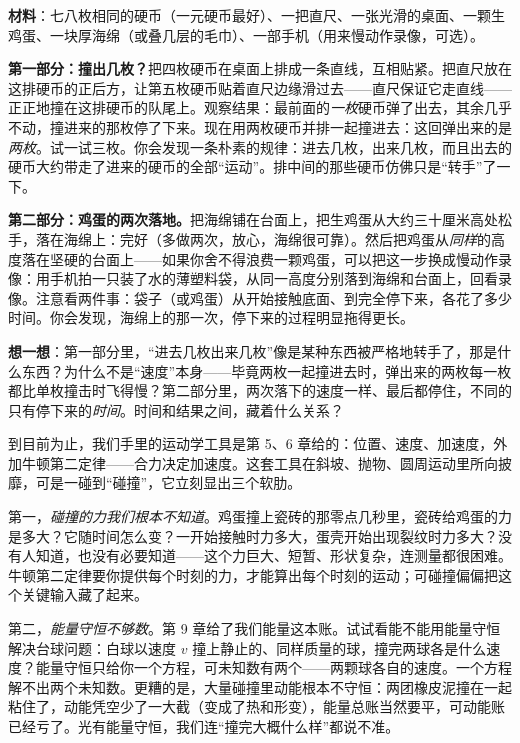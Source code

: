 \begin{experiment}[桌面上的碰撞快递]
\textbf{材料}：七八枚相同的硬币（一元硬币最好）、一把直尺、一张光滑的桌面、一颗生鸡蛋、一块厚海绵（或叠几层的毛巾）、一部手机（用来慢动作录像，可选）。

\textbf{第一部分：撞出几枚？}把四枚硬币在桌面上排成一条直线，互相贴紧。把直尺放在这排硬币的正后方，让第五枚硬币贴着直尺边缘滑过去——直尺保证它走直线——正正地撞在这排硬币的队尾上。观察结果：最前面的\emph{一枚}硬币弹了出去，其余几乎不动，撞进来的那枚停了下来。现在用两枚硬币并排一起撞进去：这回弹出来的是\emph{两枚}。试一试三枚。你会发现一条朴素的规律：进去几枚，出来几枚，而且出去的硬币大约带走了进来的硬币的全部“运动”。排中间的那些硬币仿佛只是“转手”了一下。

\textbf{第二部分：鸡蛋的两次落地。}把海绵铺在台面上，把生鸡蛋从大约三十厘米高处松手，落在海绵上：完好（多做两次，放心，海绵很可靠）。然后把鸡蛋从\emph{同样}的高度落在坚硬的台面上——如果你舍不得浪费一颗鸡蛋，可以把这一步换成慢动作录像：用手机拍一只装了水的薄塑料袋，从同一高度分别落到海绵和台面上，回看录像。注意看两件事：袋子（或鸡蛋）从开始接触底面、到完全停下来，各花了多少时间。你会发现，海绵上的那一次，停下来的过程明显拖得更长。

\textbf{想一想}：第一部分里，“进去几枚出来几枚”像是某种东西被严格地转手了，那是什么东西？为什么不是“速度”本身——毕竟两枚一起撞进去时，弹出来的两枚每一枚都比单枚撞击时飞得慢？第二部分里，两次落下的速度一样、最后都停住，不同的只有停下来的\emph{时间}。时间和结果之间，藏着什么关系？
\end{experiment}


到目前为止，我们手里的运动学工具是第 5、6 章给的：位置、速度、加速度，外加牛顿第二定律——合力决定加速度。这套工具在斜坡、抛物、圆周运动里所向披靡，可是一碰到“碰撞”，它立刻显出三个软肋。

第一，\emph{碰撞的力我们根本不知道}。鸡蛋撞上瓷砖的那零点几秒里，瓷砖给鸡蛋的力是多大？它随时间怎么变？一开始接触时力多大，蛋壳开始出现裂纹时力多大？没有人知道，也没有必要知道——这个力巨大、短暂、形状复杂，连测量都很困难。牛顿第二定律要你提供每个时刻的力，才能算出每个时刻的运动；可碰撞偏偏把这个关键输入藏了起来。

第二，\emph{能量守恒不够数}。第 9 章给了我们能量这本账。试试看能不能用能量守恒解决台球问题：白球以速度 \(v\) 撞上静止的、同样质量的球，撞完两球各是什么速度？能量守恒只给你一个方程，可未知数有两个——两颗球各自的速度。一个方程解不出两个未知数。更糟的是，大量碰撞里动能根本不守恒：两团橡皮泥撞在一起粘住了，动能凭空少了一大截（变成了热和形变），能量总账当然要平，可动能账已经亏了。光有能量守恒，我们连“撞完大概什么样”都说不准。

